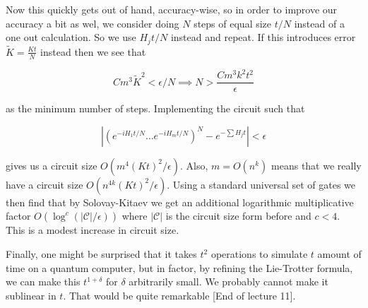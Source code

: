 \documentclass{article}
\theoremstyle{definition}
\begin{document}
Now this quickly gets out of hand, accuracy-wise, so in order to improve our
accuracy a bit as wel, we consider doing $N$ steps of equal size $t/N$ instead
of a one out calculation. So we use $H_j t / N$ instead and repeat. If this
introduces error $\tilde{K} = \frac{Kt}{N}$ instead then we see that

$$ Cm^3 \tilde{K}^2 < \epsilon / N \implies N > \frac{C m^3 k^2
  t^2}{\epsilon} $$

as the minimum number of steps. Implementing the circuit such that

$$ \left| \left( e^{-iH_1 t / N} \dots e^{-iH_m t / N} \right)^N - e^{-\sum H_j
    t} \right| < \epsilon $$

gives us a circuit size $O(m^4 (Kt)^2 / \epsilon)$. Also, $m = O(n^k)$ means
that we really have a circuit size $O(n^{4k} (Kt)^2 / \epsilon)$. Using a
standard universal set of gates we then find that by Solovay-Kitaev we get an
additional logarithmic multiplicative factor $O(\log^c(|\mathcal{C}| /
\epsilon))$ where $|\mathcal{C}|$ is the circuit size form before and $c < 4$.
This is a modest increase in circuit size.

Finally, one might be surprised that it takes $t^2$ operations to simulate $t$
amount of time on a quantum computer, but in factor, by refining the Lie-Trotter
formula, we can make this $t^{1 + \delta}$ for $\delta$ arbitrarily small. We
probably cannot make it sublinear in $t$. That would be quite remarkable [End of
lecture 11]. 
\end{document}
